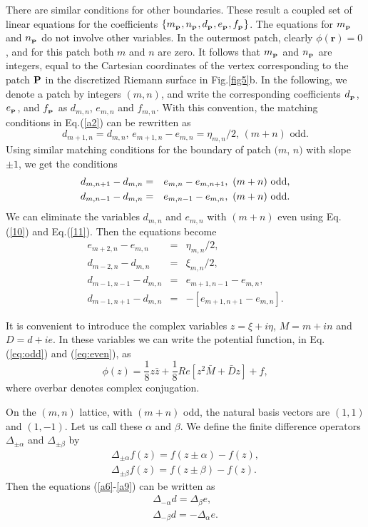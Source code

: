 \documentclass[11pt,a4paper]{book}
\def\p{{_{\bf P}}}
\begin{document}
There are similar conditions for other boundaries. These result a 
coupled set of linear equations for the coefficients $\{m_\p, n_\p, 
d_\p,e_\p,f_\p\}$. The equations for $m_\p$ and $n_\p$ do not involve 
other variables. In the outermost patch, clearly $\phi(\mathbf{r})=0$, and for this patch
both $m$ and $n$ are zero. It follows that $m_\p$ and 
$n_\p$ are integers, equal to the Cartesian coordinates of the 
vertex corresponding to the patch 
${\bf P}$ in  the discretized Riemann surface in Fig.\ref{fig5}b.  In the
following, we denote a patch by integers
$(m,n)$, and write the corresponding coefficients $d_\p$, $e_\p$, and
$f_\p$ as $d_{m,n}$, $e_{m,n}$ and $f_{m,n}$.   
With this convention,
the matching conditions in Eq.(\ref{a2}) can be rewritten as 
\begin{equation}
d_{m+1,n}=d_{m,n} \textrm{, } e_{m+1,n}-e_{m,n}=\eta_{m,n}/2 \textrm{, $(m+n)$ odd}.
\label{10}
\end{equation}
Using similar matching conditions for the boundary
of patch $(m$, $n)$ with slope $\pm1$, we get the conditions
\begin{eqnarray}
d_{m,n+1}-d_{m,n} &=& e_{m,n} -e_{m,n+1},\textrm{    }(m+n)\rm{~odd},
\nonumber \\
d_{m,n-1}-d_{m,n} &=& e_{m,n-1} - e_{m,n},\textrm{    }(m+n)\rm{~odd}.
\label{11}
\end{eqnarray}
We can eliminate the variables $d_{m,n}$ and $e_{m,n}$ with $(m+n)$
even using Eq. (\ref{10}) and Eq.(\ref{11}). Then the equations become 
\begin{eqnarray}
e_{m+2,n}-e_{m,n} &=& \eta_{m,n}/2, \label{a6}\\
d_{m-2,n}-d_{m,n} &=& \xi_{m,n}/2, \label{a7}\\
d_{m-1,n-1}-d_{m,n} &=& e_{m+1,n-1}-e_{m,n}, \label{a8}\\
d_{m-1,n+1}-d_{m,n} &=& -[e_{m+1,n+1}-e_{m,n}]. \label{a9} 
\end{eqnarray}


It is convenient to introduce the complex variables $z = \xi + i \eta$,
$ M = m + i n$ and $D = d + i e$. In these variables we can write
the potential function, in Eq. (\ref{eq:odd}) and (\ref{eq:even}), as
\begin{equation}
\phi(z) =  \frac{1}{8} z \bar{z} + \frac{1}{8} Re[ z^2 \bar{M} + \bar{D} 
z] +f,
\end{equation}
where overbar denotes complex conjugation.

On the $(m,n)$ lattice, with $(m + n)$ odd, the natural basis vectors are 
$(1,1)$ and $(1,-1)$. Let us call these $\alpha$ and $\beta$. We define 
the finite difference operators  $\Delta_{\pm \alpha}$ and $\Delta_{\pm 
\beta}$ by 
\begin{eqnarray}
\Delta_{\pm \alpha} f(z) = f( z \pm \alpha) - f(z),\nonumber\\
\Delta_{\pm \beta} f(z) = f(z \pm \beta) -f(z).
\end{eqnarray}
Then the equations (\ref{a6}-\ref{a9}) can be written as
\begin{eqnarray}
\Delta_{-\alpha} d = \Delta_{\beta} e, \nonumber \\
\Delta_{-\beta} d = -\Delta_{\alpha} e.
\end{eqnarray}
\end{document}
